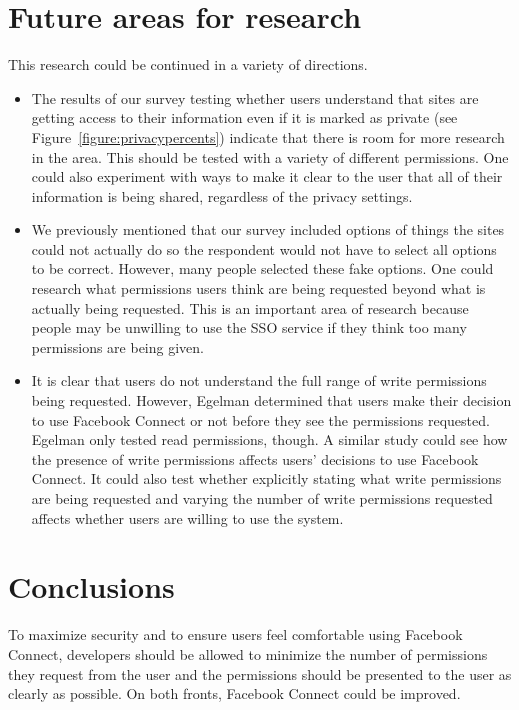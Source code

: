 \documentclass[10pt]{sig-alternate-10pt}
\begin{document}
\section{Future areas for research}

This research could be continued in a variety of directions.

\begin{itemize}
  \item The results of our survey testing whether users understand that sites are getting access to their information even if it is marked as private (see Figure~\ref{figure:privacypercents}) indicate that there is room for more research in the area. This should be tested with a variety of different permissions. One could also experiment with ways to make it clear to the user that all of their information is being shared, regardless of the privacy settings.
  \item We previously mentioned that our survey included options of things the sites could not actually do so the respondent would not have to select all options to be correct. However, many people selected these fake options. One could research what permissions users think are being requested beyond what is actually being requested. This is an important area of research because people may be unwilling to use the SSO service if they think too many permissions are being given.
  \item It is clear that users do not understand the full range of write permissions being requested. However, Egelman \cite{egelman} determined that users make their decision to use Facebook Connect or not before they see the permissions requested. Egelman only tested read permissions, though. A similar study could see how the presence of write permissions affects users' decisions to use Facebook Connect. It could also test whether explicitly stating what write permissions are being requested and varying the number of write permissions requested affects whether users are willing to use the system.
\end{itemize}



\section{Conclusions}

To maximize security and to ensure users feel comfortable using Facebook Connect, developers should be allowed to minimize the number of permissions they request from the user and the permissions should be presented to the user as clearly as possible. On both fronts, Facebook Connect could be improved.
\end{document}
